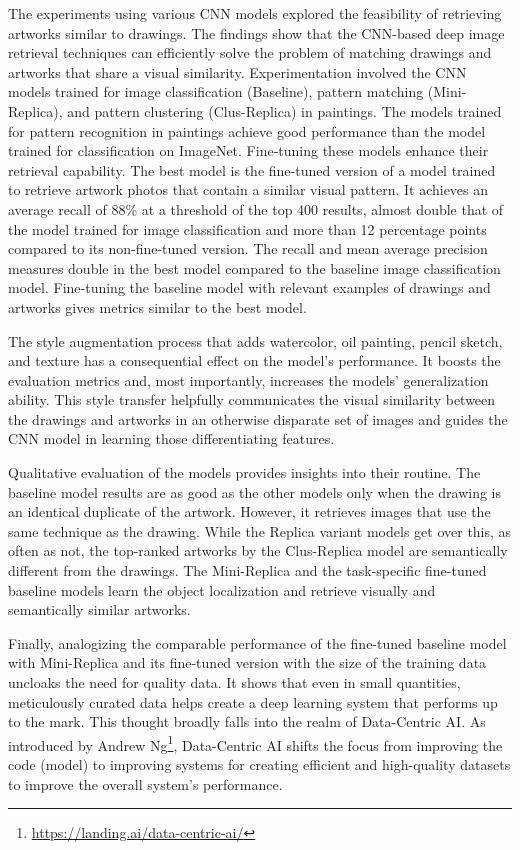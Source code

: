 The experiments using various CNN models explored the feasibility of retrieving artworks similar to drawings. The findings show that the CNN-based deep image retrieval techniques can efficiently solve the problem of matching drawings and artworks that share a visual similarity. Experimentation involved the CNN models trained for image classification (Baseline), pattern matching (Mini-Replica), and pattern clustering (Clus-Replica) in paintings. The models trained for pattern recognition in paintings achieve good performance than the model trained for classification on ImageNet. Fine-tuning these models enhance their retrieval capability. The best model is the fine-tuned version of a model trained to retrieve artwork photos that contain a similar visual pattern. It achieves an average recall of 88\% at a threshold of the top 400 results, almost double that of the model trained for image classification and more than 12 percentage points compared to its non-fine-tuned version. The recall and mean average precision measures double in the best model compared to the baseline image classification model. Fine-tuning the baseline model with relevant examples of drawings and artworks gives metrics similar to the best model.

The style augmentation process that adds watercolor, oil painting, pencil sketch, and texture has a consequential effect on the model's performance. It boosts the evaluation metrics and, most importantly, increases the models' generalization ability. This style transfer helpfully communicates the visual similarity between the drawings and artworks in an otherwise disparate set of images and guides the CNN model in learning those differentiating features.

Qualitative evaluation of the models provides insights into their routine. The baseline model results are as good as the other models only when the drawing is an identical duplicate of the artwork. However, it retrieves images that use the same technique as the drawing. While the Replica variant models get over this, as often as not, the top-ranked artworks by the Clus-Replica model are semantically different from the drawings. The Mini-Replica and the task-specific fine-tuned baseline models learn the object localization and retrieve visually and semantically similar artworks.

Finally, analogizing the comparable performance of the fine-tuned baseline model with Mini-Replica and its fine-tuned version with the size of the training data uncloaks the need for quality data. It shows that even in small quantities, meticulously curated data helps create a deep learning system that performs up to the mark. This thought broadly falls into the realm of Data-Centric AI. As introduced by Andrew Ng\footnote{\url{https://landing.ai/data-centric-ai/}}, Data-Centric AI shifts the focus from improving the code (model) to improving systems for creating efficient and high-quality datasets to improve the overall system's performance.

